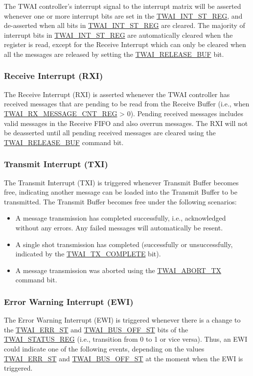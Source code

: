 \documentclass[main\_\_EN.tex]{subfiles}
\begin{document}
The TWAI controller’s interrupt signal to the interrupt matrix will be asserted whenever one or more interrupt bits are set in the \hyperref[regdesc:TWAIINTSTREG]{TWAI\_INT\_ST\_REG}, and de-asserted when all bits in \hyperref[regdesc:TWAIINTSTREG]{TWAI\_INT\_ST\_REG} are cleared. The majority of interrupt bits in \hyperref[regdesc:TWAIINTSTREG]{TWAI\_INT\_ST\_REG} are automatically cleared when the register is read, except for the Receive Interrupt which can only be cleared when all the messages are released by setting the \hyperref[fielddesc:TWAIRELEASEBUF]{TWAI\_RELEASE\_BUF} bit.

\subsubsection{Receive Interrupt (RXI)}
The Receive Interrupt (RXI) is asserted whenever the TWAI controller has received messages that are pending to be read from the Receive Buffer (i.e., when \hyperref[regdesc:TWAIRXMESSAGECNTREG]{TWAI\_RX\_MESSAGE\_CNT\_REG} > 0). Pending received messages includes valid messages in the Receive FIFO and also overrun messages. The RXI will not be deasserted until all pending received messages are cleared using the \hyperref[fielddesc:TWAIRELEASEBUF]{TWAI\_RELEASE\_BUF} command bit.


\subsubsection{Transmit Interrupt (TXI)}
The Transmit Interrupt (TXI) is triggered whenever Transmit Buffer becomes free, indicating another message can be loaded into the Transmit Buffer to be transmitted. The Transmit Buffer becomes free under the following scenarios:

\begin{itemize}
    \item A message transmission has completed successfully, i.e., acknowledged without any errors. Any failed messages will automatically be resent.
    \item A single shot transmission has completed (successfully or unsuccessfully, indicated by the \hyperref[fielddesc:TWAITXCOMPLETE]{TWAI\_TX\_COMPLETE} bit).
    \item A message transmission was aborted using the \hyperref[fielddesc:TWAIABORTTX]{TWAI\_ABORT\_TX} command bit.
\end{itemize}

\subsubsection{Error Warning Interrupt (EWI)}
The Error Warning Interrupt (EWI) is triggered whenever there is a change to the \hyperref[fielddesc:TWAIERRST]{TWAI\_ERR\_ST} and \hyperref[fielddesc:TWAIBUSOFFST]{TWAI\_BUS\_OFF\_ST} bits of the \hyperref[regdesc:TWAISTATUSREG]{TWAI\_STATUS\_REG} (i.e., transition from 0 to 1 or vice versa). Thus, an EWI could indicate one of the following events, depending on the values \hyperref[fielddesc:TWAIERRST]{TWAI\_ERR\_ST} and \hyperref[fielddesc:TWAIBUSOFFST]{TWAI\_BUS\_OFF\_ST} at the moment when the EWI is triggered.
\end{document}
